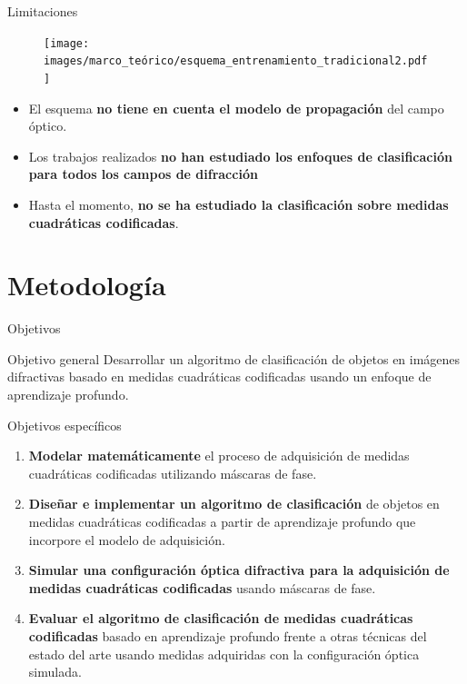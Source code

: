 \documentclass[aspectratio=169,t,xcolor=table]{beamer}
\begin{document}
\begin{frame}{Limitaciones}
\scriptsize
    \begin{figure}
        \centering
        \texttt{[image: images/marco\_teórico/esquema\_entrenamiento\_tradicional2.pdf]}
    \end{figure}
    \begin{itemize}
        \item El esquema \textbf{no tiene en cuenta el modelo de propagación} del campo óptico.
        \item Los trabajos realizados \textbf{no han estudiado los enfoques de clasificación para todos los campos de difracción}
        \item Hasta el momento, \textbf{no se ha estudiado la clasificación sobre medidas cuadráticas codificadas}.
    \end{itemize}
\end{frame}




\section{Metodología}
\begin{frame}{Objetivos}
\scriptsize
\begin{block}{\small Objetivo general}
Desarrollar un algoritmo de clasificación de objetos en imágenes difractivas basado en medidas cuadráticas codificadas usando un enfoque de aprendizaje profundo.

\end{block}
\begin{block}{\small Objetivos específicos}
\scriptsize
\begin{enumerate}

    \item \textbf{Modelar matemáticamente} el proceso de adquisición de medidas cuadráticas codificadas utilizando máscaras de fase.

    \item \textbf{Diseñar e implementar un algoritmo de clasificación} de objetos en medidas cuadráticas codificadas a partir de aprendizaje profundo que incorpore el modelo de adquisición.
    
    \item \textbf{Simular una configuración óptica difractiva para la adquisición de medidas cuadráticas codificadas} usando máscaras de fase.
    
    \item \textbf{Evaluar el algoritmo de clasificación de medidas cuadráticas codificadas} basado en aprendizaje profundo frente a otras técnicas del estado del arte usando medidas adquiridas con la configuración óptica simulada.

\end{enumerate}
\end{block}
\end{frame}
\end{document}
